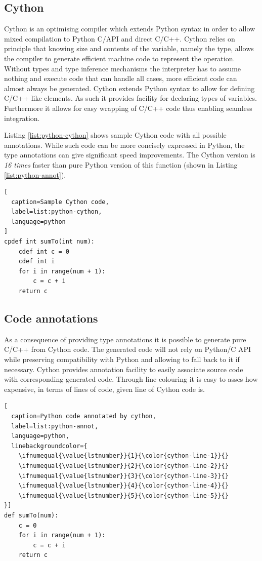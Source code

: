 \documentclass[12pt, a4paper]{report}
\begin{document}
\subsection{Cython}\label{subsec:cython}
Cython \cite{Cython} is an optimising compiler which extends Python syntax in order
to allow mixed compilation to Python C/API and direct C/C++. Cython
relies on principle that knowing size and contents of the variable,
namely the type, allows the compiler to generate efficient machine
code to represent the operation. Without types and type inference
mechanisms the interpreter has to assume nothing and execute code
that can handle all cases, more efficient code can almost always
be generated. Cython extends Python syntax to allow for defining
C/C++ like elements. As such it provides facility for declaring types
of variables. Furthermore it allows for easy wrapping of C/C++ code
thus enabling seamless integration.

Listing \ref{list:python-cython} shows sample Cython code with all possible
annotations. While such code can be more concisely expressed in Python, the type
annotations can give significant speed improvements. The Cython version is
\emph{16 times} faster than pure Python version of this function (shown in Listing
\ref{list:python-annot}).

\begin{lstlisting}[
  caption=Sample Cython code,
  label=list:python-cython,
  language=python
]
cpdef int sumTo(int num):
    cdef int c = 0
    cdef int i
    for i in range(num + 1):
        c = c + i
    return c
\end{lstlisting}

\subsection{Code annotations}\label{subsec:cython-code-annot}
As a consequence of providing type annotations it is possible to generate
pure C/C++ from Cython code. The generated code will not rely on Python/C API
while preserving compatibility with Python and allowing to fall back to it if necessary.
Cython provides annotation facility to easily associate source code with
corresponding generated code. Through line colouring it is easy to asses how
expensive, in terms of lines of code, given line of Cython code is.

\begin{lstlisting}[
  caption=Python code annotated by cython,
  label=list:python-annot,
  language=python,
  linebackgroundcolor={
    \ifnumequal{\value{lstnumber}}{1}{\color{cython-line-1}}{}
    \ifnumequal{\value{lstnumber}}{2}{\color{cython-line-2}}{}
    \ifnumequal{\value{lstnumber}}{3}{\color{cython-line-3}}{}
    \ifnumequal{\value{lstnumber}}{4}{\color{cython-line-4}}{}
    \ifnumequal{\value{lstnumber}}{5}{\color{cython-line-5}}{}
}]
def sumTo(num):
    c = 0
    for i in range(num + 1):
        c = c + i
    return c
\end{lstlisting}
\end{document}
